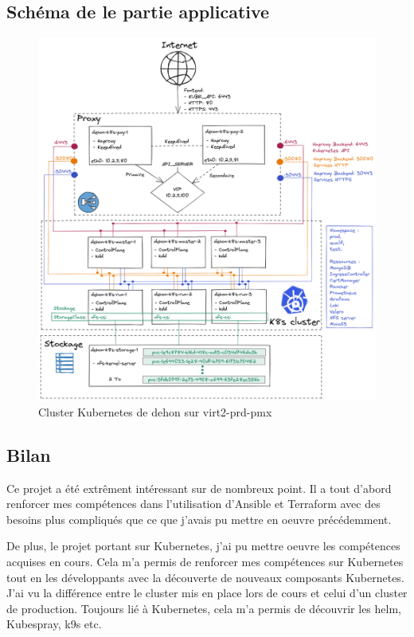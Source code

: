 \documentclass[12pt, a4paper, twoside]{article}
\begin{document}
\subsection{Schéma de le partie applicative}
\begin{figure}[!ht]
    \centering
        \includegraphics[width=\textwidth]{src/graph_dehon2.png}
    \caption{Cluster \gls{Kubernetes} de dehon sur virt2-prd-pmx}
    \label{fig:graph_dehon2}
\end{figure}

\subsection{Bilan}
Ce projet a été extrêment intéressant sur de nombreux point.
Il a tout d'abord renforcer mes compétences dans l'utilisation d'\gls{Ansible} et \gls{Terraform} avec des besoins plus compliqués que ce que j'avais pu mettre en oeuvre précédemment.

De plus, le projet portant sur \gls{Kubernetes}, j'ai pu mettre oeuvre les compétences acquises en cours. 
Cela m'a permis de renforcer mes compétences sur \gls{Kubernetes} tout en les développants avec la découverte de nouveaux composants \gls{Kubernetes}.
J'ai vu la différence entre le \gls{cluster} mis en place lors de cours et celui d'un \gls{cluster} de production.
Toujours lié à \gls{Kubernetes}, cela m'a permis de découvrir les helm, \gls{Kubespray}, k9s etc.
\end{document}
